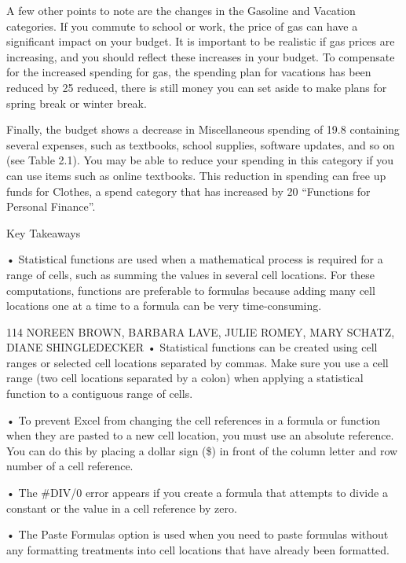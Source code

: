 A few other points to note are the changes in the Gasoline and Vacation categories. If you commute
to school or work, the price of gas can have a significant impact on your budget. It is important
to be realistic if gas prices are increasing, and you should reflect these increases in your budget. To
compensate for the increased spending for gas, the spending plan for vacations has been reduced by
25%
reduced, there is still money you can set aside to make plans for spring break or winter break.

Finally, the budget shows a decrease in Miscellaneous spending of 19.8%
containing several expenses, such as textbooks, school supplies, software updates, and so on (see
Table 2.1). You may be able to reduce your spending in this category if you can use items such as
online textbooks. This reduction in spending can free up funds for Clothes, a spend category that has
increased by 20%
“Functions for Personal Finance”.


Key Takeaways


• Statistical functions are used when a mathematical process is required for a range of cells, such as summing
the values in several cell locations. For these computations, functions are preferable to formulas because
adding many cell locations one at a time to a formula can be very time-consuming.



114 NOREEN BROWN, BARBARA LAVE, JULIE ROMEY, MARY SCHATZ, DIANE SHINGLEDECKER
• Statistical functions can be created using cell ranges or selected cell locations separated by commas. Make
sure you use a cell range (two cell locations separated by a colon) when applying a statistical function to a
contiguous range of cells.

• To prevent Excel from changing the cell references in a formula or function when they are pasted to a new
cell location, you must use an absolute reference. You can do this by placing a dollar sign (\$) in front of the
column letter and row number of a cell reference.

• The \#DIV/0 error appears if you create a formula that attempts to divide a constant or the value in a cell
reference by zero.

• The Paste Formulas option is used when you need to paste formulas without any formatting treatments into
cell locations that have already been formatted.

